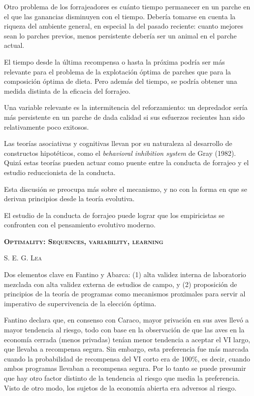\documentclass[a4paper,12pt]{article}
\begin{document}
Otro problema de los forrajeadores es cuánto tiempo permanecer en un parche en el que las ganancias disminuyen con el tiempo. Debería tomarse en cuenta la riqueza del ambiente general, en especial la del pasado reciente: cuanto mejores sean lo parches previos, menos persistente debería ser un animal en el parche actual.

El tiempo desde la última recompensa o hasta la próxima podría ser más relevante para el problema de la explotación óptima de parches que para la composición óptima de dieta. Pero además del tiempo, se podría obtener una medida distinta de la eficacia del forrajeo.

Una variable relevante es la intermitencia del reforzamiento: un depredador sería más persistente en un parche de dada calidad si sus esfuerzos recientes han sido relativamente poco exitosos. 

Las teorías asociativas y cognitivas llevan por su naturaleza al desarrollo de constructos hipotéticos, como el {\itshape behavioral inhibition system} de Gray (1982). Quizá estas teorías pueden actuar como puente entre la conducta de forrajeo y el estudio reduccionista de la conducta. 

Esta discusión se preocupa más sobre el mecanismo, y no con la forma en que se derivan principios desde la teoría evolutiva. 

El estudio de la conducta de forrajeo puede lograr que los empiricistas se confronten con el pensamiento evolutivo moderno.

{\scshape\bfseries Optimality: Sequences, variability, learning}

{\scshape S. E. G. Lea}

Dos elementos clave en Fantino y Abarca: (1) alta validez interna de laboratorio mezclada con alta validez externa de estudios de campo, y (2) proposición de principios de la teoría de programas como mecanismos proximales para servir al imperativo de supervivencia de la elección óptima. 

Fantino declara que, en consenso con Caraco, mayor privación en sus aves llevó a mayor tendencia al riesgo, todo con base en la observación de que las aves en la economía cerrada (menos privadas) tenían menor tendencia a aceptar el VI largo, que llevaba a recompensa segura. Sin embargo, esta preferencia fue más marcada cuando la probabilidad de recompensa del VI corto era de 100\%, es decir, cuando ambos programas llevaban a recompensa segura. Por lo tanto se puede presumir que hay otro factor distinto de la tendencia al riesgo que media la preferencia. Visto de otro modo, los sujetos de la economía abierta era adversos al riesgo.
\end{document}
